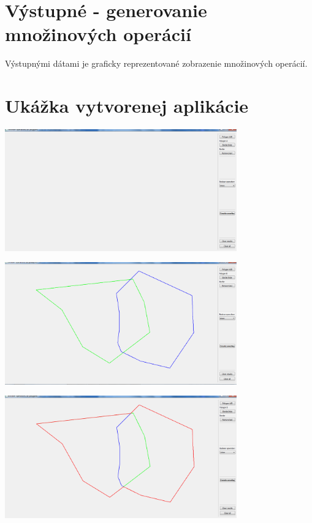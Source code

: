 \documentclass[12pt]{article}
\begin{document}
\section{Výstupné - generovanie množinových operácií}
Výstupnými dátami je graficky reprezentované zobrazenie množinových operácií.


\section{Ukážka vytvorenej aplikácie}

\begin{center}
   \includegraphics[width=10cm]{./img/aplikacia1.png}
\end{center}

\begin{center}
   \includegraphics[width=10cm]{./img/aplikacia2.png}
\end{center}

\begin{center}
   \includegraphics[width=10cm]{./img/aplikacia_union.png}
\end{center}
\end{document}

